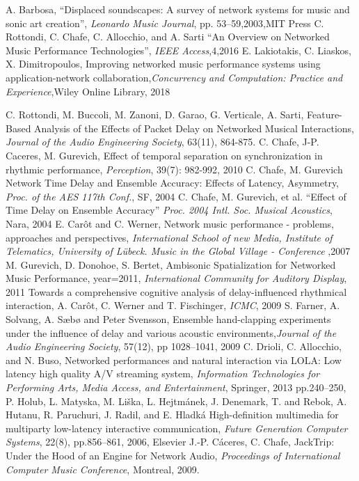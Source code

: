 A. Barbosa, ``Displaced soundscapes: A survey of network systems for music and sonic art creation'',
\emph{Leonardo Music Journal},
pp. 53--59,2003,MIT Press
%
C. Rottondi, C. Chafe, C. Allocchio, and A. Sarti
``An Overview on Networked Music Performance Technologies'', \emph{IEEE Access},4,2016
%
E. Lakiotakis, C. Liaskos, X. Dimitropoulos, Improving networked music performance systems using application-network collaboration,\emph{Concurrency and Computation: Practice and Experience},Wiley Online Library, 2018

C. Rottondi, M. Buccoli, M. Zanoni, D. Garao,  G. Verticale, A. Sarti,  Feature-Based Analysis of the Effects of Packet Delay on Networked Musical Interactions, \emph{Journal of the Audio Engineering Society}, 63(11), 864-875.
C. Chafe, J-P. Caceres, M. Gurevich, Effect of temporal separation on synchronization in rhythmic performance,
\emph{Perception}, 39(7): 982-992, 2010
%
C. Chafe, M. Gurevich Network Time Delay and Ensemble Accuracy: Effects of Latency, Asymmetry,
\emph{Proc. of the AES 117th Conf.}, SF, 2004
%
C. Chafe, M. Gurevich, et al. “Effect of Time Delay on Ensemble Accuracy”
\emph{Proc. 2004 Intl. Soc. Musical Acoustics}, Nara, 2004
E. Car\^ot and C. Werner, Network music performance - problems, approaches and perspectives,
\emph{International School of new Media, Institute of Telematics, University of Lübeck. Music in the Global Village - Conference}
,2007
%
M. Gurevich, D. Donohoe, S. Bertet,
Ambisonic Spatialization for Networked Music Performance,
year={2011},
\emph{International Community for Auditory Display}, 2011
Towards a comprehensive cognitive analysis of delay-influenced rhythmical interaction,
A. Car{\^o}t, C. Werner and T. Fischinger,
\emph{ICMC},
2009
%
S. Farner, A. Solvang, A. Sæbø and Peter Svensson, Ensemble hand-clapping experiments under
the influence of delay and various acoustic
environments,\emph{Journal of the Audio Engineering Society}, 57(12),
pp 1028--1041, 2009
C. Drioli, C. Allocchio, and N. Buso,
Networked performances and natural interaction via LOLA: Low latency high quality A/V streaming system,
\emph{Information Technologies for Performing Arts, Media Access, and Entertainment}, Springer, 2013
pp.240--250,
P. Holub, L. Matyska, M. Li{\v{s}}ka, L. Hejtm{\'a}nek, J. Denemark, T. and Rebok, A. Hutanu, R. Paruchuri, J. Radil, and E. Hladk{\'a}
High-definition multimedia for multiparty low-latency interactive communication,
\emph{Future Generation Computer Systems},
22(8),
pp.856--861,
2006,
Elsevier
J.-P. C\'{a}ceres, C. Chafe, JackTrip: Under the Hood of an Engine for Network Audio, \emph{Proceedings of International Computer Music Conference}, Montreal, 2009. 

